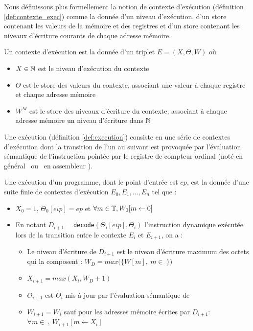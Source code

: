 
Nous définissons plus formellement la notion de contexte d'exécution (définition \ref{def:contexte_exec}) comme la donnée d'un niveau d'exécution, d'un store contenant les valeurs de la mémoire et des registres et d'un store contenant les niveaux d'écriture courants de chaque adresse mémoire.

\begin{defi}
Un contexte d'exécution est la donnée d'un triplet $E=(X, \Theta, W)$ où
\begin{itemize}
 \item $X\in\mathbb N$ est le niveau d'exécution du contexte
 \item $\Theta$ est le store des valeurs du contexte, associant une valeur à chaque registre et chaque adresse mémoire
 \item $W^M$ est le store des niveaux d'écriture du contexte, associant à chaque adresse mémoire un niveau d'écriture dans $\mathbb N$
\end{itemize}
\label{def:contexte_exec}
\end{defi}

Une exécution (définition \ref{def:execution}) consiste en une série de contextes d'exécution dont la transition de l'un au suivant est provoquée par l'évaluation sémantique de l'instruction pointée par le registre de compteur ordinal (noté en général \pc\ ou \eip\ en assembleur \xq). 

\begin{defi}
Une exécution d'un programme, dont le point d'entrée est $ep$, est la donnée d'une suite finie de contextes d'exécution $E_0, E_1, ..., E_n$ tel que :
\begin{itemize}
 \item $X_0=1$, $\Theta_0[eip]=ep$ et $\forall m\in \mathbb T, W_0[m\leftarrow 0]$
 \item En notant $D_{i+1}=$\texttt{decode}$(\Theta_i[eip], \Theta_i)$ l'instruction dynamique exécutée lors de la transition entre le contexte $E_i$ et $E_{i+1}$, on a :
    \begin{itemize}
     \item Le niveau d'écriture de $D_{i+1}$ est le niveau d'écriture maximum des octets qui la composent : $W_D=max(\{W[m],\ m\in\ $$\})$
     \item $X_{i+1}=max(X_i, W_D+1)$
     \item $\Theta_{i+1}$ est $\Theta_i$ mis à jour par l'évaluation sémantique de 
     \item $W_{i+1}=W_{i}$ sauf pour les adresses mémoire écrites par $D_{i+1}$:\\ $\forall m\in\ $$,\ W_{i+1}[m\leftarrow X_i]$
    \end{itemize}
\end{itemize}
\label{def:execution}
\end{defi}

